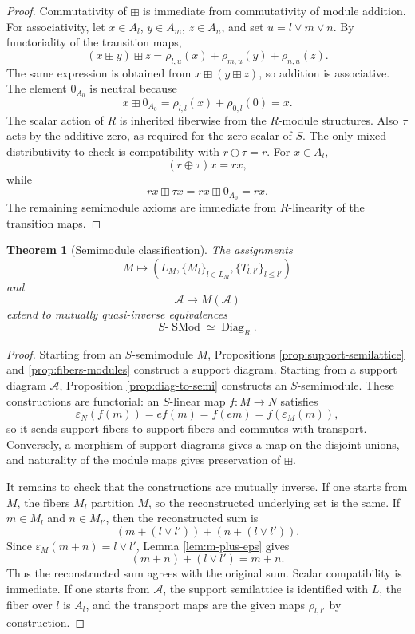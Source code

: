 \documentclass[11pt]{article}
\newcommand{\eps}{\varepsilon}
\theoremstyle{plain}
\newtheorem{theorem}{Theorem}[section]
\theoremstyle{definition}
\begin{document}
\begin{proof}
Commutativity of \(\boxplus\) is immediate from commutativity of module addition.  For associativity, let \(x\in A_l\), \(y\in A_m\), \(z\in A_n\), and set \(u=l\vee m\vee n\).  By functoriality of the transition maps,
\[
   (x\boxplus y)\boxplus z
   =\rho_{l,u}(x)+\rho_{m,u}(y)+\rho_{n,u}(z).
\]
The same expression is obtained from \(x\boxplus(y\boxplus z)\), so addition is associative.  The element \(0_{A_0}\) is neutral because
\[
   x\boxplus 0_{A_0}=\rho_{l,l}(x)+\rho_{0,l}(0)=x.
\]
The scalar action of \(R\) is inherited fiberwise from the \(R\)-module structures.  Also \(\tau\) acts by the additive zero, as required for the zero scalar of \(S\).  The only mixed distributivity to check is compatibility with \(r\oplus\tau=r\).  For \(x\in A_l\),
\[
   (r\oplus\tau)x=rx,
\]
while
\[
   rx\boxplus \tau x=rx\boxplus 0_{A_0}=rx.
\]
The remaining semimodule axioms are immediate from \(R\)-linearity of the transition maps.
\end{proof}

\begin{theorem}[Semimodule classification]\label{thm:semimodule-classification}
The assignments
\[
   M\longmapsto (L_M,\{M_l\}_{l\in L_M},\{T_{l,l'}\}_{l\le l'})
\]
and
\[
   \mathcal A\longmapsto M(\mathcal A)
\]
extend to mutually quasi-inverse equivalences
\[
   S\text{-}\operatorname{SMod}\simeq \operatorname{Diag}_R.
\]
\end{theorem}

\begin{proof}
Starting from an \(S\)-semimodule \(M\), Propositions \ref{prop:support-semilattice} and \ref{prop:fibers-modules} construct a support diagram.  Starting from a support diagram \(\mathcal A\), Proposition \ref{prop:diag-to-semi} constructs an \(S\)-semimodule.  These constructions are functorial: an \(S\)-linear map \(f:M\to N\) satisfies
\[
   \eps_N(f(m))=ef(m)=f(em)=f(\eps_M(m)),
\]
so it sends support fibers to support fibers and commutes with transport.  Conversely, a morphism of support diagrams gives a map on the disjoint unions, and naturality of the module maps gives preservation of \(\boxplus\).

It remains to check that the constructions are mutually inverse.  If one starts from \(M\), the fibers \(M_l\) partition \(M\), so the reconstructed underlying set is the same.  If \(m\in M_l\) and \(n\in M_{l'}\), then the reconstructed sum is
\[
   (m+(l\vee l'))+(n+(l\vee l')).
\]
Since \(\eps_M(m+n)=l\vee l'\), Lemma \ref{lem:m-plus-eps} gives
\[
   (m+n)+(l\vee l')=m+n.
\]
Thus the reconstructed sum agrees with the original sum.  Scalar compatibility is immediate.  If one starts from \(\mathcal A\), the support semilattice is identified with \(L\), the fiber over \(l\) is \(A_l\), and the transport maps are the given maps \(\rho_{l,l'}\) by construction.
\end{proof}
\end{document}
